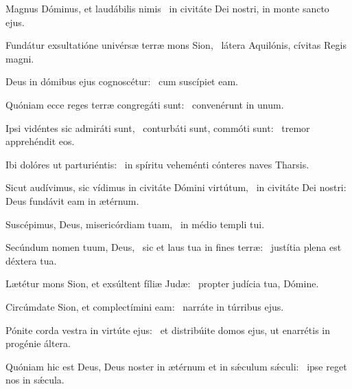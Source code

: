 \item Magnus Dóminus, et laudábilis nimis~\psstar{} in civitáte Dei nostri, in monte sancto ejus.

\item Fundátur exsultatióne univérsæ terræ mons Sion,~\psstar{} látera Aquilónis, cívitas Regis magni.

\item Deus in dómibus ejus cognoscétur:~\psstar{} cum suscípiet eam.

\item Quóniam ecce reges terræ congregáti sunt:~\psstar{} convenérunt in unum.

\item Ipsi vidéntes sic admiráti sunt,~\pscross{} conturbáti sunt, commóti sunt:~\psstar{} tremor apprehéndit eos.

\item Ibi dolóres ut parturiéntis:~\psstar{} in spíritu veheménti cónteres naves Tharsis.

\item Sicut audívimus, sic vídimus in civitáte Dómini virtútum,~\pscross{} in civitáte Dei nostri:~\psstar{} Deus fundávit eam in ætérnum.

\item Suscépimus, Deus, misericórdiam tuam,~\psstar{} in médio templi tui.

\item Secúndum nomen tuum, Deus,~\pscross{} sic et laus tua in fines terræ:~\psstar{} justítia plena est déxtera tua.

\item Lætétur mons Sion, et exsúltent fíliæ Judæ:~\psstar{} propter judícia tua, Dómine.

\item Circúmdate Sion, et complectímini eam:~\psstar{} narráte in túrribus ejus.

\item Pónite corda vestra in virtúte ejus:~\psstar{} et distribúite domos ejus, ut enarrétis in progénie áltera.

\item Quóniam hic est Deus, Deus noster in ætérnum et in sǽculum sǽculi:~\psstar{} ipse reget nos in sǽcula.
